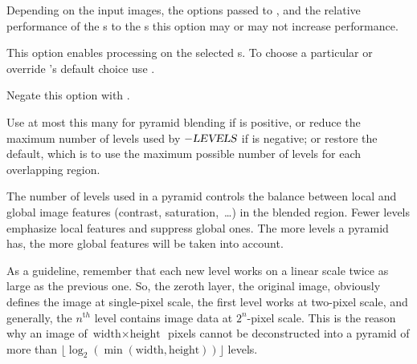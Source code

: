 \begin{codelist}
  Depending on the input images, the options passed to \App{}, and the relative performance of
  the s to the s this option may or may not increase performance.

  This option enables  processing on the selected s.  To choose a
  particular  or override \App's default choice use
  .

  Negate this option with .


  \label{opt:levels}%
\item[\itempar{-l \metavar{LEVELS} \\ --levels=\metavar{LEVELS}}]\itemend
  Use at most this many  for pyramid\footnotemark{} blending if 
  is positive, or reduce the maximum number of levels used by $-\textsl{LEVELS}$ if
   is negative;  or  restore the default, which
  is to use the maximum possible number of levels for each overlapping region.


  The number of levels used in a pyramid controls the balance between local and global image
  features (contrast, saturation,~\dots) in the blended region.  Fewer levels emphasize local
  features and suppress global ones.  The more levels a pyramid has, the more global features
  will be taken into account.

  \begin{geeknote}
    As a guideline, remember that each new level works on a linear scale twice as large as the
    previous one.  So, the zeroth layer, the original image, obviously defines the image at
    single-pixel scale, the first level works at two-pixel scale, and generally, the $n^{\mathrm
      th}$ level contains image data at $2^n$-pixel scale.  This is the reason why an image of
    $\mbox{width} \times \mbox{height}$~pixels cannot be deconstructed into a pyramid of more
    than $\lfloor \log_2(\min(\mbox{width}, \mbox{height})) \rfloor$ levels.


\end{geeknote}
\end{codelist}
